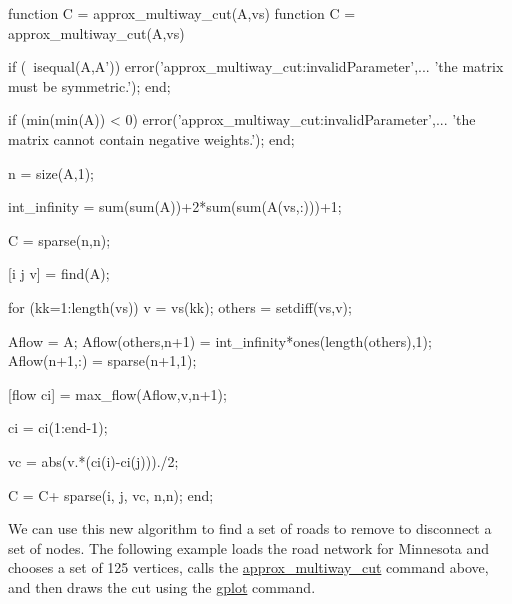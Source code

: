 \documentclass[12pt]{article}
\newcommand{\mycmd}[1]{\url{#1}}
\begin{document}
\begin{mcode}
function C = approx_multiway_cut(A,vs)
function C = approx_multiway_cut(A,vs)
% 
%
%
%

if (~isequal(A,A'))
    error('approx_multiway_cut:invalidParameter',...
        'the matrix must be symmetric.');
end;

if (min(min(A)) < 0)
    error('approx_multiway_cut:invalidParameter',...
        'the matrix cannot contain negative weights.');
end;

n = size(A,1);

int_infinity = sum(sum(A))+2*sum(sum(A(vs,:)))+1;

C = sparse(n,n);

[i j v] = find(A);

for (kk=1:length(vs))
    v = vs(kk);
    others = setdiff(vs,v);
    
    Aflow = A;
    Aflow(others,n+1) = int_infinity*ones(length(others),1);
    Aflow(n+1,:) = sparse(n+1,1);
    
    [flow ci] = max_flow(Aflow,v,n+1);
    
    ci = ci(1:end-1);
    
    vc = abs(v.*(ci(i)-ci(j)))./2;
    
    C = C+ sparse(i, j, vc, n,n);
end;
\end{mcode}

We can use this new algorithm to find a set of roads to remove to disconnect a set of nodes.  The following example loads the road network for Minnesota and chooses a set of 125 vertices, calls the \mycmd{approx_multiway_cut} command above, and then draws the cut using the \mycmd{gplot} command.  
\end{document}
